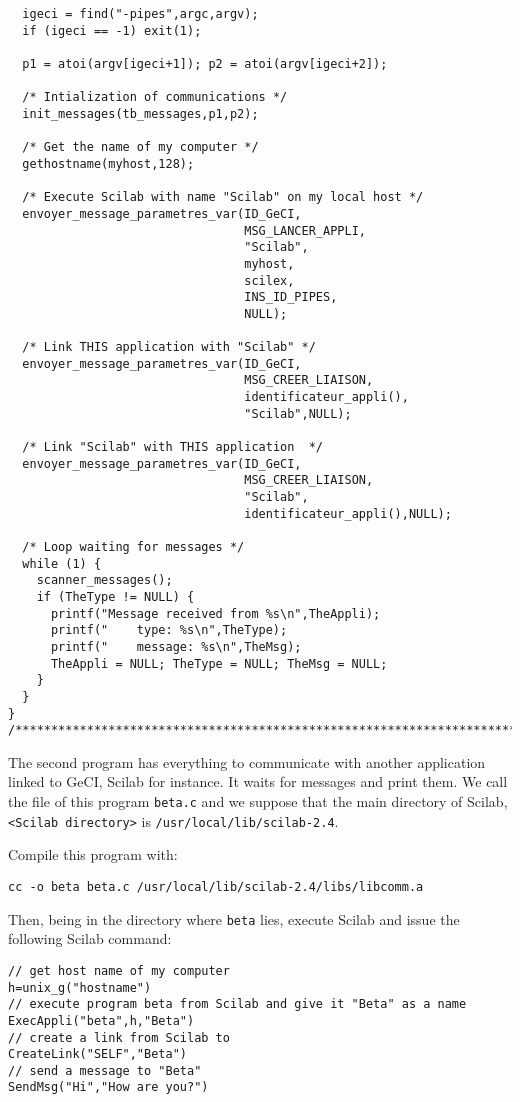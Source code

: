 \documentclass[11pt]{article}
\newcommand{\T}[1]{\texttt{#1}}
\begin{document}
\begin{verbatim}
  igeci = find("-pipes",argc,argv);
  if (igeci == -1) exit(1);

  p1 = atoi(argv[igeci+1]); p2 = atoi(argv[igeci+2]);

  /* Intialization of communications */
  init_messages(tb_messages,p1,p2);

  /* Get the name of my computer */
  gethostname(myhost,128);

  /* Execute Scilab with name "Scilab" on my local host */
  envoyer_message_parametres_var(ID_GeCI,
                                 MSG_LANCER_APPLI,
                                 "Scilab",
                                 myhost,
                                 scilex,
                                 INS_ID_PIPES,
                                 NULL);

  /* Link THIS application with "Scilab" */
  envoyer_message_parametres_var(ID_GeCI,
                                 MSG_CREER_LIAISON, 
                                 identificateur_appli(),
                                 "Scilab",NULL);
  
  /* Link "Scilab" with THIS application  */
  envoyer_message_parametres_var(ID_GeCI,
                                 MSG_CREER_LIAISON, 
                                 "Scilab",
                                 identificateur_appli(),NULL);

  /* Loop waiting for messages */
  while (1) {
    scanner_messages();
    if (TheType != NULL) {
      printf("Message received from %s\n",TheAppli);
      printf("    type: %s\n",TheType);
      printf("    message: %s\n",TheMsg);
      TheAppli = NULL; TheType = NULL; TheMsg = NULL;
    }
  }
}
/***************************************************************************/
\end{verbatim} 

\bigskip
 
The second program has everything to communicate with another
application linked to GeCI, Scilab for instance.
It waits for messages and print them. We call the file of this program 
\T{beta.c}
and we suppose that the main directory of Scilab, 
\verb|<Scilab directory>| is \T{/usr/local/lib/scilab-2.4}.

Compile this program with:
 
\begin{verbatim}
cc -o beta beta.c /usr/local/lib/scilab-2.4/libs/libcomm.a
\end{verbatim}

Then, being in the directory where \T{beta} lies, execute Scilab and
issue the following Scilab command:
\begin{verbatim}
// get host name of my computer
h=unix_g("hostname")
// execute program beta from Scilab and give it "Beta" as a name
ExecAppli("beta",h,"Beta")
// create a link from Scilab to 
CreateLink("SELF","Beta")
// send a message to "Beta"
SendMsg("Hi","How are you?")
\end{verbatim}
\end{document}

